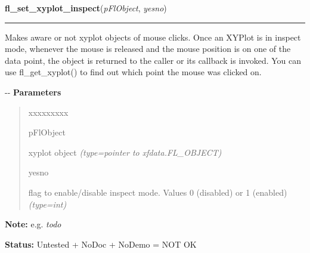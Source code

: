     \vspace{0.5ex}

\hspace{.8\funcindent}\begin{boxedminipage}{\funcwidth}

    \raggedright \textbf{fl\_set\_xyplot\_inspect}(\textit{pFlObject}, \textit{yesno})

    \vspace{-1.5ex}

    \rule{\textwidth}{0.5\fboxrule}
\setlength{\parskip}{2ex}

Makes aware or not xyplot objects of mouse clicks. Once an XYPlot is in
inspect mode, whenever the mouse is released and the mouse position is on
one of the data point, the object is returned to the caller or its
callback is invoked. You can use fl\_get\_xyplot() to find out which point
the mouse was clicked on.

-{}-
\setlength{\parskip}{1ex}
      \textbf{Parameters}
      \vspace{-1ex}

      \begin{quote}
        \begin{Ventry}{xxxxxxxxx}

          \item[pFlObject]


xyplot object
            {\it (type=pointer to xfdata.FL\_OBJECT)}

          \item[yesno]


flag to enable/disable inspect mode. Values 0 (disabled) or 1 (enabled)
            {\it (type=int)}

        \end{Ventry}

      \end{quote}

\textbf{Note:} 
e.g. \emph{todo}


\textbf{Status:} 
Untested + NoDoc + NoDemo = NOT OK


    \end{boxedminipage}

    \label{xformslib:flxyplot:fl_set_xyplot_symbolsize}

    \vspace{0.5ex}

